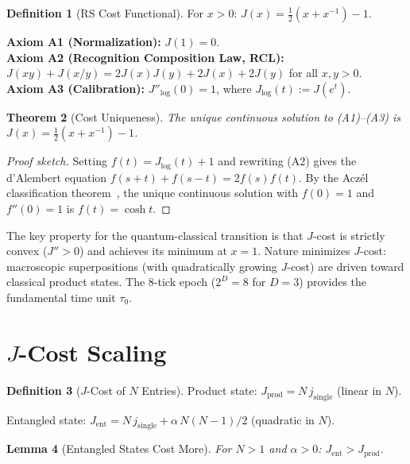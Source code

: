\documentclass[12pt,a4paper]{article}
\newtheorem{theorem}{Theorem}[section]
\newtheorem{lemma}[theorem]{Lemma}
\theoremstyle{definition}
\newtheorem{definition}[theorem]{Definition}
\theoremstyle{remark}
\begin{document}
\begin{definition}[RS Cost Functional]
For $x > 0$: $J(x) = \tfrac{1}{2}(x + x^{-1}) - 1$.
\end{definition}

\noindent\textbf{Axiom A1 (Normalization):} $J(1) = 0$.\\
\textbf{Axiom A2 (Recognition Composition Law, RCL):}
$J(xy) + J(x/y) = 2J(x)J(y) + 2J(x) + 2J(y)$ for all $x, y > 0$.\\
\textbf{Axiom A3 (Calibration):} $J''_{\log}(0) = 1$, where
$J_{\log}(t) := J(e^t)$.

\begin{theorem}[Cost Uniqueness]
\label{thm:unique}
The unique continuous solution to \textup{(A1)--(A3)} is
$J(x) = \tfrac{1}{2}(x + x^{-1}) - 1$.
\end{theorem}

\begin{proof}[Proof sketch]
Setting $f(t) = J_{\log}(t) + 1$ and rewriting \textup{(A2)} gives the
d'Alembert equation $f(s+t) + f(s-t) = 2f(s)f(t)$.  By the Acz\'el
classification theorem~\cite{Aczel1966}, the unique continuous solution
with $f(0) = 1$ and $f''(0) = 1$ is $f(t) = \cosh t$.
\end{proof}

\noindent The key property for the quantum-classical transition is that $J$-cost
is strictly convex ($J'' > 0$) and achieves its minimum at $x = 1$.
Nature minimizes $J$-cost: macroscopic superpositions (with quadratically
growing $J$-cost) are driven toward classical product states.  The 8-tick
epoch ($2^D = 8$ for $D = 3$) provides the fundamental time unit $\tau_0$.

\section{$J$-Cost Scaling}

\begin{definition}[$J$-Cost of $N$ Entries]
Product state: $J_{\mathrm{prod}} = N\,j_{\mathrm{single}}$
(linear in $N$).

Entangled state:
$J_{\mathrm{ent}} = N\,j_{\mathrm{single}}
+ \alpha\,N(N-1)/2$ (quadratic in $N$).
\end{definition}

\begin{lemma}[Entangled States Cost More]
For $N > 1$ and $\alpha > 0$:
$J_{\mathrm{ent}} > J_{\mathrm{prod}}$.
\end{lemma}
\end{document}
